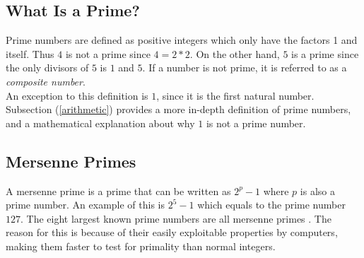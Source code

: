 \documentclass[main.tex]{subfiles}
\begin{document}
\subsection{What Is a Prime?}
Prime numbers are defined as positive integers which only have the factors 1 and
itself. Thus $4$ is not a prime since $4 = 2 * 2$. On the other hand, $5$ is a
prime since the only divisors of $5$ is $1$ and $5$. If a number is not prime, it is referred to as a \textit{composite number}. \\

An exception to this definition is $1$, since it is the first natural number.
Subsection (\ref{arithmetic}) provides a more in-depth definition of prime
numbers, and a mathematical explanation about why $1$ is not a prime number.

\subsection{Mersenne Primes}
A mersenne prime is a prime that can be written as $2^{p}-1$ where $p$ is also a
prime number. An example of this is $2^5-1$ which equals to the prime number
$127$. The eight largest known prime numbers are all mersenne primes
\cite{prime:largest_digits}. The reason for this is because of their easily
exploitable properties by computers, making them faster to test for primality
than normal integers.
\end{document}
